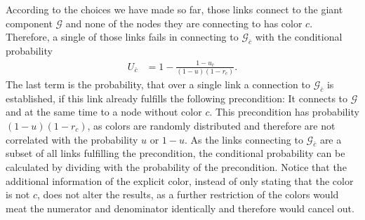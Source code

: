 \documentclass[aps, pre, onecolumn, a4paper, floatfix]{revtex4}
\begin{document}
According to the choices we have made so far, those links connect to the giant component 
${\mathcal G}$ and none of the nodes they are connecting to has color $c$. Therefore, a single 
of those links fails in connecting to ${\mathcal G}_{\bar c}$ with the conditional probability 
\begin{align}
U_{\bar c} &= 1 - \frac{1-u_{\bar c}}{(1-u)(1-r_c)}.\label{eq:U_c}
\end{align}
The last term is the probability, that over a single link a connection to ${\mathcal G}_{\bar c}$
is established, if this link already fulfills the following precondition: 
It connects to ${\mathcal G}$ and at the same time to a node without color $c$. 
This precondition has probability $(1-u)(1-r_c)$, as colors are randomly distributed and therefore 
are not correlated with the probability $u$ or $1-u$. As the links connecting to ${\mathcal G}_{\bar c}$ 
are a subset of all links fulfilling the precondition, the conditional probability can be 
calculated by dividing with the probability of the precondition. 
Notice that the additional information of the explicit color, instead of only stating that the color 
is not $c$, does not alter the results, as a further restriction of the colors 
would meat the numerator and denominator identically and therefore would cancel out. 
\end{document}
